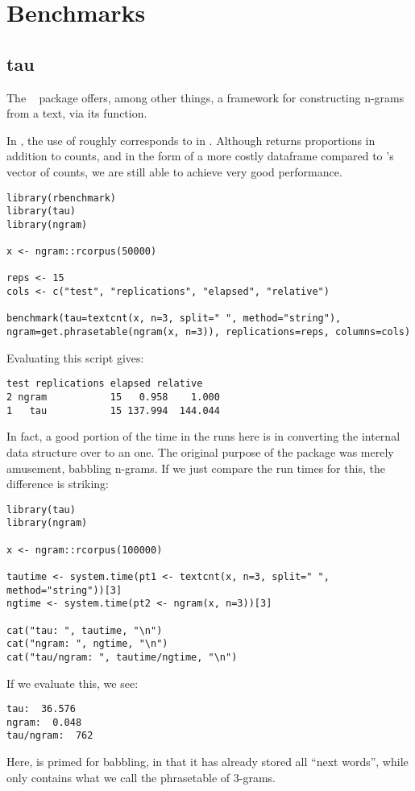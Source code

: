 \section{Benchmarks}\label{sec:benchmarks}

\subsection{tau}

The ~\citep{tau} package offers, among other things, a framework for 
constructing n-grams from a text, via its  function.

In , the use of  roughly corresponds
to  in .  Although
 returns proportions in addition to counts, and in the
form of a more costly dataframe compared to 's vector of counts, we
are still able to achieve very good performance.
\begin{lstlisting}[language=rr]
library(rbenchmark)
library(tau)
library(ngram)

x <- ngram::rcorpus(50000)

reps <- 15
cols <- c("test", "replications", "elapsed", "relative")

benchmark(tau=textcnt(x, n=3, split=" ", method="string"), ngram=get.phrasetable(ngram(x, n=3)), replications=reps, columns=cols)
\end{lstlisting}
Evaluating this script gives:
\begin{lstlisting}[language=rout]
   test replications elapsed relative
2 ngram           15   0.958    1.000
1   tau           15 137.994  144.044
\end{lstlisting}

In fact, a good portion of the time in the  runs here is in converting the
internal  data structure over to an  one.  The original
purpose of the  package was merely amusement, babbling n-grams.
If we just compare the run times for this, the difference is striking:
\begin{lstlisting}[language=rr]
library(tau)
library(ngram)

x <- ngram::rcorpus(100000)

tautime <- system.time(pt1 <- textcnt(x, n=3, split=" ", method="string"))[3]
ngtime <- system.time(pt2 <- ngram(x, n=3))[3]

cat("tau: ", tautime, "\n")
cat("ngram: ", ngtime, "\n")
cat("tau/ngram: ", tautime/ngtime, "\n")
\end{lstlisting}
If we evaluate this, we see:
\begin{lstlisting}[language=rout]
tau:  36.576 
ngram:  0.048 
tau/ngram:  762 
\end{lstlisting}
Here,  is primed for babbling, in that it has already stored all
``next words'', while  only contains what we call the phrasetable of
3-grams.



